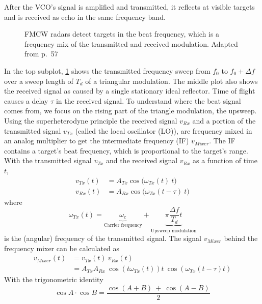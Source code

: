 After the VCO's signal is amplified and transmitted, it reflects at
visible targets and is received as echo in the same frequency band.

\begin{figure}[htp]
    \centering
    \def\svgwidth{10cm}
    
    \caption{\label{fig:fmcw_triangular}FMCW radars detect targets in the beat frequency, which is a frequency mix of the transmitted and received modulation. Adapted from \cite{Adams2012} p.~57}
\end{figure}

In the top subplot, \cref{fig:fmcw_triangular} shows the transmitted frequency sweep
from \(f_0\) to \(f_0 + \Delta f\) over a sweep length of \(T_d\) of a
triangular modulation. The middle plot also shows the received signal as
caused by a single stationary ideal reflector. Time of flight causes a
delay \(\tau\) in the received signal. To understand where the beat
signal comes from, we focus on the rising part of the triangle
modulation, the upsweep. Using the superheterodyne principle the
received signal \(v_{Rx}\) and a portion of the transmitted signal
\(v_{Tx}\) (called the local oscillator (LO)), are frequency mixed in an
analog multiplier to get the intermediate frequency (IF) \(v_{Mixer}\).
The IF contains a target's beat frequency, which is proportional to the
target's range. With the transmitted signal \(v_{Tx}\) and the received
signal \(v_{Rx}\) as a function of time \(t\), 
\begin{align*} \label{eq:fmcw1}
    v_{Tx}(t) &= A_{Tx} \cos\bigl(\omega_{Tx}(t)~t\bigr)\\
    v_{Rx}(t) &= A_{Rx} \cos\bigl(\omega_{Tx}(t-\tau)~t\bigr)
\end{align*}
where
\begin{equation*}
    \omega_{Tx}(t) = \underbrace{\omega_c}_\text{Carrier frequency} + \underbrace{\pi \frac{\Delta f}{T_d} t}_\text{Upsweep modulation}
\end{equation*}
is the (angular) frequency of the transmitted signal. The signal \(v_{Mixer}\) behind the frequency mixer can be calculated as 
\begin{align*}
    v_{Mixer}(t) &= v_{Tx}(t) ~ v_{Rx}(t) \\
    &= A_{Tx}A_{Rx}~\cos(t\omega_{Tx}(t))t~\cos(\omega_{Tx}(t-\tau)t)
\end{align*}
With the trigonometric identity
\begin{equation*}
	 \cos A \cdot \cos B = \frac{ \cos(A+B)~+~\cos(A-B) }{2} 
\end{equation*}
